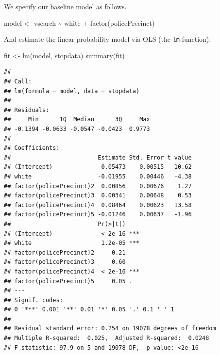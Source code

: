 \documentclass[
  12pt,
]{style/krantz}
\newenvironment{Shaded}{\begin{snugshade}}{\end{snugshade}}
\newcommand{\CommentTok}[1]{\textcolor[rgb]{0.56,0.35,0.01}{\textit{#1}}}
\newcommand{\DecValTok}[1]{\textcolor[rgb]{0.00,0.00,0.81}{#1}}
\newcommand{\FunctionTok}[1]{\textcolor[rgb]{0.00,0.00,0.00}{#1}}
\newcommand{\NormalTok}[1]{#1}
\newcommand{\OtherTok}[1]{\textcolor[rgb]{0.56,0.35,0.01}{#1}}
\newcommand{\SpecialCharTok}[1]{\textcolor[rgb]{0.00,0.00,0.00}{#1}}
\newcommand{\StringTok}[1]{\textcolor[rgb]{0.31,0.60,0.02}{#1}}
\begin{document}
\begin{Shaded}
\end{Shaded}

We specify our baseline model as follows.

\begin{Shaded}
\begin{Highlighting}[]
\NormalTok{model }\OtherTok{\textless{}{-}}\NormalTok{ vsearch }\SpecialCharTok{\textasciitilde{}}\NormalTok{ white }\SpecialCharTok{+} \FunctionTok{factor}\NormalTok{(policePrecinct)}
\end{Highlighting}
\end{Shaded}

And estimate the linear probability model via OLS (the \texttt{lm} function).

\begin{Shaded}
\begin{Highlighting}[]
\NormalTok{fit }\OtherTok{\textless{}{-}} \FunctionTok{lm}\NormalTok{(model, stopdata)}
\FunctionTok{summary}\NormalTok{(fit)}
\end{Highlighting}
\end{Shaded}

\begin{verbatim}
## 
## Call:
## lm(formula = model, data = stopdata)
## 
## Residuals:
##     Min      1Q  Median      3Q     Max 
## -0.1394 -0.0633 -0.0547 -0.0423  0.9773 
## 
## Coefficients:
##                         Estimate Std. Error t value
## (Intercept)              0.05473    0.00515   10.62
## white                   -0.01955    0.00446   -4.38
## factor(policePrecinct)2  0.00856    0.00676    1.27
## factor(policePrecinct)3  0.00341    0.00648    0.53
## factor(policePrecinct)4  0.08464    0.00623   13.58
## factor(policePrecinct)5 -0.01246    0.00637   -1.96
##                         Pr(>|t|)    
## (Intercept)              < 2e-16 ***
## white                    1.2e-05 ***
## factor(policePrecinct)2     0.21    
## factor(policePrecinct)3     0.60    
## factor(policePrecinct)4  < 2e-16 ***
## factor(policePrecinct)5     0.05 .  
## ---
## Signif. codes:  
## 0 '***' 0.001 '**' 0.01 '*' 0.05 '.' 0.1 ' ' 1
## 
## Residual standard error: 0.254 on 19078 degrees of freedom
## Multiple R-squared:  0.025,  Adjusted R-squared:  0.0248 
## F-statistic: 97.9 on 5 and 19078 DF,  p-value: <2e-16
\end{verbatim}
\end{document}
